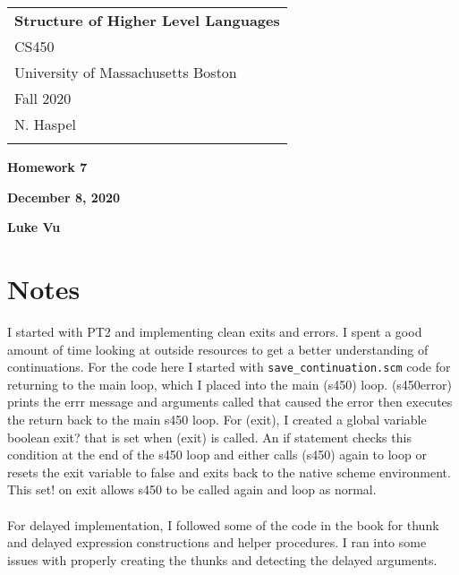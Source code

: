 \documentclass[a4paper,12pt]{article}
\begin{document}
	\thispagestyle{empty}
	
	\begin{tabular}{p{15.5cm}}
		{\large \bf Structure of Higher Level Languages} \\ CS450 \\
		University of Massachusetts Boston \\ Fall 2020  \\ N. Haspel\\
		\hline
		\\
	\end{tabular}

	\vspace*{0.1cm}
	
	\begin{center}
		{\Large \bf Homework 7}
		\vspace{1mm}
		
		{\bf December 8, 2020}
		\vspace{1mm}
		
		{\bf Luke Vu}	
	\end{center} 

	\vspace*{0.5cm}
	
\section{Notes}
I started with PT2 and implementing clean exits and errors. I spent a good amount of time looking at outside resources to get a better understanding of continuations. For the code here I started with \texttt{save\_continuation.scm} code for returning to the main loop, which I placed into the main (s450) loop. (s450error) prints the errr message and arguments called that caused the error then executes the return back to the main s450 loop. For (exit), I created a global variable boolean exit? that is set when (exit) is called. An if statement checks this condition at the end of the s450 loop and either calls (s450) again to loop or resets the exit variable to false and exits back to the native scheme environment. This set! on exit allows s450 to be called again and loop as normal.\\
\\
For delayed implementation, I followed some of the code in the book for thunk and delayed expression constructions and helper procedures. I ran into some issues with properly creating the thunks and detecting the delayed arguments.



%

%
	
\end{document}
